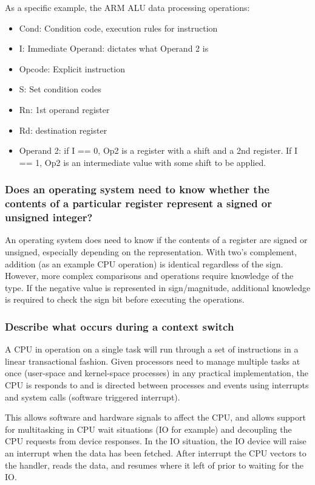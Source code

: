 \documentclass[]{article}
\begin{document}
\begin{itemize}
                As a specific example, the ARM ALU data processing operations:
                    \begin{itemize}
                        \item Cond: Condition code, execution rules for instruction
                        \item I: Immediate Operand: dictates what Operand 2 is
                        \item Opcode: Explicit instruction
                        \item S: Set condition codes
                        \item Rn: 1st operand register
                        \item Rd: destination register
                        \item Operand 2: if I == 0, Op2 is a register with a shift and a 2nd register. If I == 1, Op2 is an intermediate value with some shift to be applied.
                    \end{itemize}
            \end{itemize}
        \subsubsection{Does an operating system need to know whether the contents of a particular register represent a signed or unsigned integer?}
            An operating system does need to know if the contents of a register are signed or unsigned, especially depending on the representation. With two's complement, addition (as an example CPU operation) is identical regardless of the sign. However, more complex comparisons and operations require knowledge of the type. If the negative value is represented in sign/magnitude, additional knowledge is required to check the sign bit before executing the operations.
        \subsubsection{Describe what occurs during a context switch}
            A CPU in operation on a single task will run through a set of instructions in a linear transactional fashion. Given processors need to manage multiple tasks at once (user-space and kernel-space processes) in any practical implementation, the CPU is responds to and is directed between processes and events using interrupts and system calls (software triggered interrupt).

            This allows software and hardware signals to affect the CPU, and allows support for multitasking in CPU wait situations (IO for example) and decoupling the CPU requests from device responses. In the IO situation, the IO device will raise an interrupt when the data has been fetched. After interrupt the CPU vectors to the handler, reads the data, and resumes where it left of prior to waiting for the IO.
\end{document}
